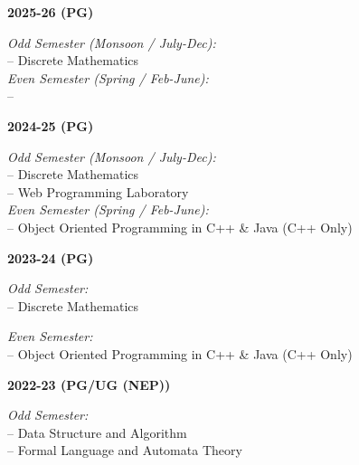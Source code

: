 \documentclass[11pt,a4paper]{moderncv}
\begin{document}
\begin{adjustwidth}{6em}{0pt}
	
	\textbf{2025-26 (PG)}
	
	\begin{adjustwidth}{2em}{0pt}
		\textit{Odd Semester (Monsoon / July-Dec):} \\
		\hspace*{1.5em}-- Discrete Mathematics \\

		
		\textit{Even Semester (Spring / Feb-June):} \\
		\hspace*{1.5em}--  \\
	\end{adjustwidth}
	
	
	\textbf{2024-25 (PG)}
	
	\begin{adjustwidth}{2em}{0pt}
		\textit{Odd Semester (Monsoon / July-Dec):} \\
		\hspace*{1.5em}-- Discrete Mathematics \\
		\hspace*{1.5em}-- Web Programming Laboratory \\
		
		\textit{Even Semester (Spring / Feb-June):} \\
		\hspace*{1.5em}-- Object Oriented Programming in C++ \& Java (C++ Only) \\
	\end{adjustwidth}
	

	
	\textbf{2023-24 (PG)}
	
	\begin{adjustwidth}{2em}{0pt}
		\textit{Odd Semester:} \\
		\hspace*{1.5em}-- Discrete Mathematics 
		
		\textit{Even Semester:} \\
		\hspace*{1.5em}-- Object Oriented Programming in C++ \& Java (C++ Only) \\
	\end{adjustwidth}
	

	
	\textbf{2022-23 (PG/UG (NEP))}
	
	\begin{adjustwidth}{2em}{0pt}
		\textit{Odd Semester:} \\
		\hspace*{1.5em}-- Data Structure and Algorithm \\
		\hspace*{1.5em}-- Formal Language and Automata Theory 
		

\end{adjustwidth}
\end{adjustwidth}
\end{document}

